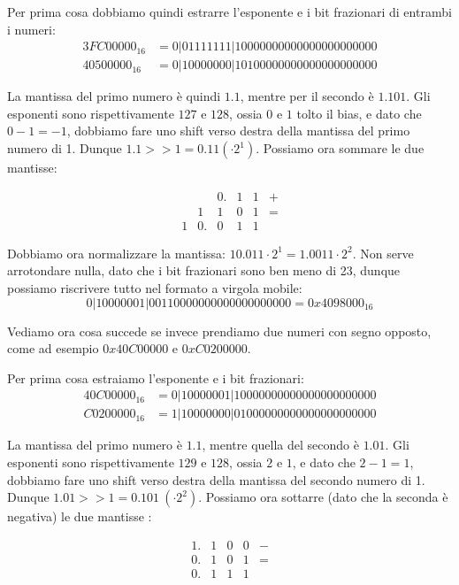 \documentclass[11pt, a4paper, titlepage, oneside]{scrbook}
\begin{document}
Per prima cosa dobbiamo quindi estrarre l'esponente e i bit frazionari di entrambi i numeri:
\begin{align*}
3FC00000_{16} &= 0|01111111|10000000000000000000000 \\
40500000_{16} &= 0|10000000|10100000000000000000000
\end{align*}

La mantissa del primo numero è quindi $1.1$, mentre per il secondo è $1.101$. Gli esponenti sono rispettivamente $127$ e $128$, ossia $0$ e $1$ tolto il bias, e dato che $0 - 1= - 1$, dobbiamo fare uno shift verso destra della mantissa del primo numero di 1. Dunque $1.1 >> 1 = 0.11 (\cdot 2^1)$. Possiamo ora sommare le due mantisse:

\[
\begin{array}{rccccc}
& & 0. & 1 & 1 & + \\
& 1 & 1 & 0 & 1 & = \\
\hline
1 & 0. & 0 & 1 & 1 &
\end{array}
\]

Dobbiamo ora normalizzare la mantissa: $10.011 \cdot 2^1 = 1.0011 \cdot 2^2$. Non serve arrotondare nulla, dato che i bit frazionari sono ben meno di 23, dunque possiamo riscrivere tutto nel formato a virgola mobile:
\[
0|10000001|00110000000000000000000 = 0x4098000_{16}
\]

Vediamo ora cosa succede se invece prendiamo due numeri con segno opposto, come ad esempio $0x40C00000$ e $0xC0200000$. 

Per prima cosa estraiamo l'esponente e i bit frazionari:
\begin{align*}
40C00000_{16} &= 0|10000001|10000000000000000000000 \\
C0200000_{16} &= 1|10000000|01000000000000000000000
\end{align*}

La mantissa del primo numero è $1.1$, mentre quella del secondo è $1.01$. Gli esponenti sono rispettivamente $129$ e $128$, ossia $2$ e $1$, e dato che $2-1 = 1$, dobbiamo fare uno shift verso destra della mantissa del secondo numero di 1. Dunque $1.01 >> 1 =  0.101 \ (\cdot 2^2)$. Possiamo ora sottarre (dato che la seconda è negativa) le due mantisse :

\[
\begin{array}{rcccc}
1. & 1 & 0 & 0 & - \\
0. & 1 & 0 & 1 & = \\
\hline
0. & 1 & 1 & 1 &
\end{array}
\]
\end{document}
